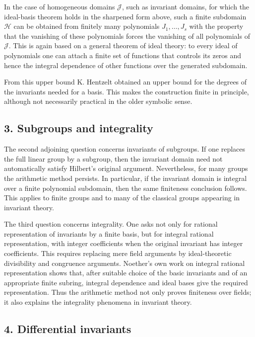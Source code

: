 \documentclass[12pt]{article}
\begin{document}
In the case of homogeneous domains $\mathcal J$, such as invariant domains, for which the ideal-basis theorem holds in the sharpened form above, such a finite subdomain $\mathcal H$ can be obtained from finitely many polynomials $J_1,\ldots,J_s$ with the property that the vanishing of these polynomials forces the vanishing of all polynomials of $\mathcal J$. This is again based on a general theorem of ideal theory: to every ideal of polynomials one can attach a finite set of functions that controls its zeros and hence the integral dependence of other functions over the generated subdomain.

From this upper bound K. Hentzelt obtained an upper bound for the degrees of the invariants needed for a basis. This makes the construction finite in principle, although not necessarily practical in the older symbolic sense.

\subsection{3. Subgroups and integrality}

The second adjoining question concerns invariants of subgroups. If one replaces the full linear group by a subgroup, then the invariant domain need not automatically satisfy Hilbert's original argument. Nevertheless, for many groups the arithmetic method persists. In particular, if the invariant domain is integral over a finite polynomial subdomain, then the same finiteness conclusion follows. This applies to finite groups and to many of the classical groups appearing in invariant theory.

The third question concerns integrality. One asks not only for rational representation of invariants by a finite basis, but for integral rational representation, with integer coefficients when the original invariant has integer coefficients. This requires replacing mere field arguments by ideal-theoretic divisibility and congruence arguments. Noether's own work on integral rational representation shows that, after suitable choice of the basic invariants and of an appropriate finite subring, integral dependence and ideal bases give the required representation. Thus the arithmetic method not only proves finiteness over fields; it also explains the integrality phenomena in invariant theory.

\subsection{4. Differential invariants}
\end{document}
